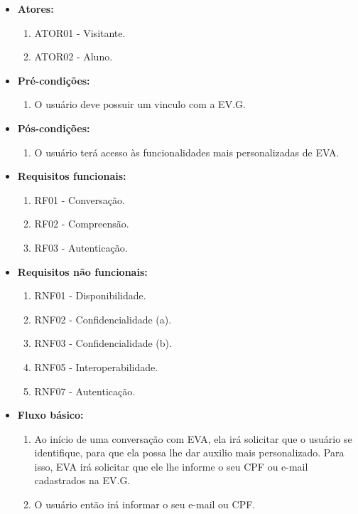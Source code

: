 \begin{itemize}
    \item \textbf{Atores:}
        \begin{enumerate}
            \item ATOR01 - Visitante.
            \item ATOR02 - Aluno.
        \end{enumerate}
    \item \textbf{Pré-condições:}
        \begin{enumerate}
            \item O usuário deve possuir um vinculo com a EV.G.
        \end{enumerate}
    \item \textbf{Pós-condições:}
        \begin{enumerate}
            \item O usuário terá acesso às funcionalidades mais personalizadas de EVA.
        \end{enumerate}
    \item \textbf{Requisitos funcionais:}
        \begin{enumerate}
            \item RF01 - Conversação.
            \item RF02 - Compreensão.
            \item RF03 - Autenticação.
        \end{enumerate}
    \item \textbf{Requisitos não funcionais:}
        \begin{enumerate}
            \item RNF01 - Disponibilidade.
            \item RNF02 - Confidencialidade (a).
            \item RNF03 - Confidencialidade (b).
            \item RNF05 - Interoperabilidade.
            \item RNF07 - Autenticação.
        \end{enumerate}
    \item \textbf{Fluxo básico:}
        \begin{enumerate}
            \item Ao início de uma conversação com EVA, ela irá solicitar que o usuário se identifique, para que ela possa lhe dar auxilio mais personalizado. Para isso, EVA irá solicitar que ele lhe informe o seu CPF ou e-mail cadastrados na EV.G.
            \item O usuário então irá informar o seu e-mail ou CPF.

\end{enumerate}
\end{itemize}
